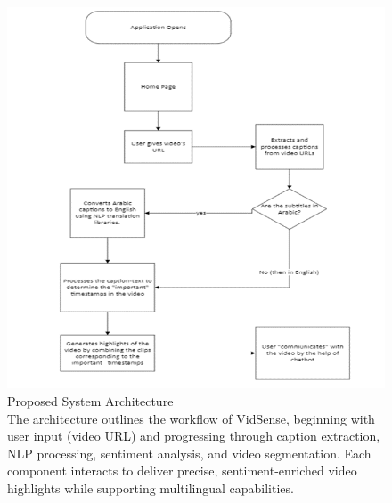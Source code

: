 \documentclass{bscs}
\begin{document}
\begin{figure}[h]
    \centering
    \includegraphics[width=1.0\textwidth]{figure_f.png}  
    \caption[Proposed System Architecture]{Proposed System Architecture\\
    The architecture outlines the workflow of VidSense, beginning with user input (video URL) and progressing through caption extraction, NLP processing, sentiment analysis, and video segmentation. Each component interacts to deliver precise, sentiment-enriched video highlights while supporting multilingual capabilities.}
    \label{fig:proposed_system_architecture}
\end{figure}
\end{document}
